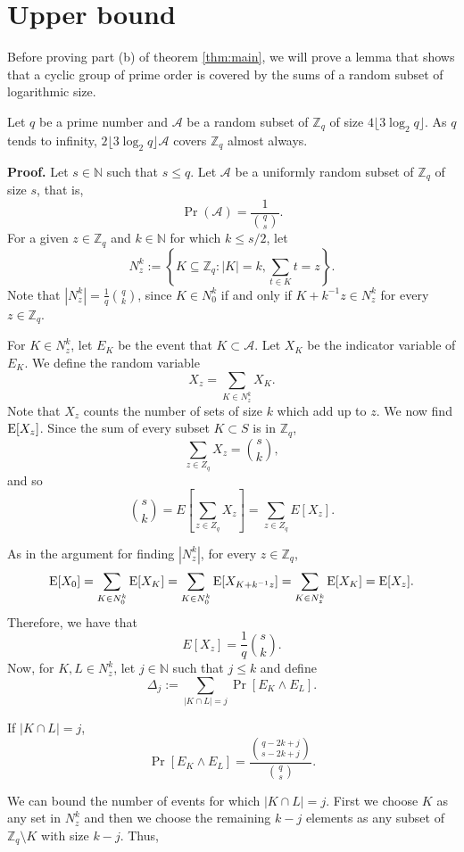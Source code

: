 \section{Upper bound}\label{sec:results:upperbound}
Before proving part (b) of theorem \ref{thm:main}, we will prove a lemma that shows that a cyclic group of prime order is covered by the sums of a random subset of logarithmic size.  
\begin{lemma}\label{lem:sumset}
    Let $q$ be a prime number and $\mathcal{A}$ be a random subset of $\mathbb{Z}_q$ of size $4\lfloor3\log_2 q\rfloor$. As $q$ tends to infinity, $2\lfloor3\log_2 q\rfloor \mathcal{A}$ covers $\mathbb{Z}_q$ almost always. 
\end{lemma}

\textbf{Proof. } Let $s \in \mathbb{N}$ such that $s\leq q$. Let $\mathcal{A}$ be a uniformly random subset of $\mathbb{Z}_q$ of size $s$, that is, 
\[\Pr(\mathcal{A}) = \frac{1}{\binom{q}{s}}.\]
For a given $z \in \mathbb{Z}_q$ and $k \in \mathbb{N}$ for which $k \leq s/2$, let 
\[N_z^k := \left\{K \subseteq \mathbb{Z}_q: |K| = k, \sum_{t \in K} t = z\right\}.\]
Note that $|N_z^k| = \frac{1}{q}{\binom{q}{k}}$, since $K \in N_0^k$ if and only if $K + k^{-1}z \in N_z^k$ for every $z \in \mathbb{Z}_q$.\par
For $K \in N_z^k$, let $E_K$ be the event that $K \subset\mathcal{A}$. Let $X_K$ be the indicator variable of $E_K$.
We define the random variable 
\[X_z = \sum_{K \in N_z^k} X_K.\]
Note that $X_z$ counts the number of sets of size $k$ which add up to $z$. We now find $\mathrm{E}[X_z]$. Since the sum of every subset $K \subset S$ is in $\mathbb{Z}_q$,
\[\sum_{z \in Z_q} X_z = {\binom{s}{k}},\]
and so
\[\binom{s}{k} = E\left[\sum_{z \in Z_q} X_z\right] =  \sum_{z \in Z_q} E[X_z].\]\par
As in the argument for finding $|N_z^k|$, for every $z \in \mathbb{Z}_q$, 
\[\mathrm{E}[X_0] = \sum_{K \in N_0^k}\mathrm{E}[X_K] = \sum_{K \in N_0^k} \mathrm{E}[X_{K + k^{-1}z}] = \sum_{K \in N_z^k} \mathrm{E}[X_K] = \mathrm{E}[X_z].\]
Therefore, we have that
\begin{equation}\label{eq:upperbound:expected}
E[X_z] = \frac{1}{q} {\binom{s}{k}}.
\end{equation}
Now, for $K, L \in N_z^k$, let $j \in \mathbb{N}$ such that $j \leq k$ and define
\[\Delta_j := \sum_{|K \cap L| = j} \Pr[E_K \land E_L].\]
\par 
If $|K \cap L| = j$,
\[\Pr[E_K \land E_L] = \frac{\binom{q - 2k + j}{s - 2k + j}}{\binom{q}{s}}.\]
\par
We can bound the number of events for which $|K \cap L| = j$. First we choose $K$ as any set in $N_z^k$ and then we choose the remaining $k- j$ elements as any subset of $\mathbb{Z}_q \setminus K$ with size $k - j$. Thus, 
